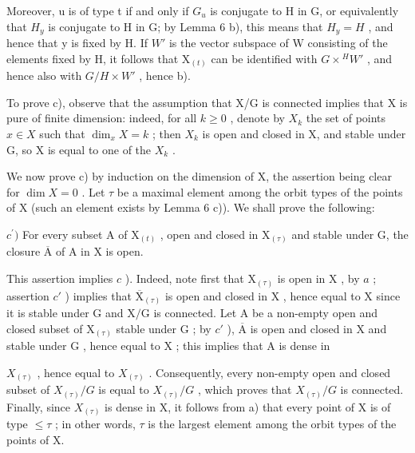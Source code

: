 Moreover, u is of type t if and only if \(G_{u}\) is conjugate to H in G, or equivalently that \(H_{y}\) is conjugate to H in G; by Lemma 6 b), this means that \(H_{y} = H\) , and hence that y is fixed by H. If \(W'\) is the vector subspace of W consisting of the elements fixed by H, it follows that \(\mathrm{X}_{(t)}\) can be identified with \(G \times {}^{H}W'\) , and hence also with \(G/H \times W'\) , hence b).

To prove c), observe that the assumption that X/G is connected implies that X is pure of finite dimension: indeed, for all \(k \geq 0\) , denote by \(X_{k}\) the set of points \(x \in X\) such that \(\dim_{x} X = k\) ; then \(X_{k}\) is open and closed in X, and stable under G, so X is equal to one of the \(X_{k}\) .

We now prove c) by induction on the dimension of X, the assertion being clear for \(\dim X = 0\) . Let \(\tau\) be a maximal element among the orbit types of the points of X (such an element exists by Lemma 6 c)). We shall prove the following:

\(c^{\prime})\) For every subset A of \(\mathrm{X}_{(t)}\) , open and closed in \(\mathrm{X}_{(\tau)}\) and stable under G, the closure \(\overline{\mathrm{A}}\) of A in X is open.

This assertion implies \(c\) ). Indeed, note first that \(\mathrm{X}_{(\tau)}\) is open in \(\mathrm{X}\) , by \(a\) ; assertion \(c'\) ) implies that \(\overline{\mathrm{X}}_{(\tau)}\) is open and closed in \(\mathrm{X}\) , hence equal to \(\mathrm{X}\) since it is stable under \(\mathrm{G}\) and \(\mathrm{X} / \mathrm{G}\) is connected. Let \(\mathrm{A}\) be a non-empty open and closed subset of \(\mathrm{X}_{(\tau)}\) stable under \(\mathrm{G}\) ; by \(c'\) ), \(\overline{\mathrm{A}}\) is open and closed in \(\mathrm{X}\) and stable under \(\mathrm{G}\) , hence equal to \(\mathrm{X}\) ; this implies that \(\mathrm{A}\) is dense in

\(X_{(\tau)}\) , hence equal to \(X_{(\tau)}\) . Consequently, every non-empty open and closed subset of \(X_{(\tau)}/G\) is equal to \(X_{(\tau)}/G\) , which proves that \(X_{(\tau)}/G\) is connected. Finally, since \(X_{(\tau)}\) is dense in X, it follows from a) that every point of X is of type \(\leq \tau\) ; in other words, \(\tau\) is the largest element among the orbit types of the points of X.


